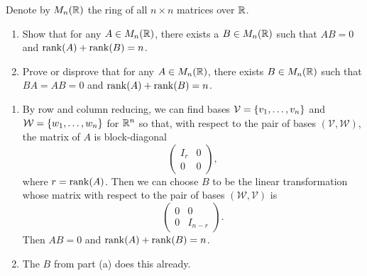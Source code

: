 \begin{question}[subtitle = August 2018 Problem 3,ID=Aug18_3]
Denote by $M_n(\mathbb{R})$ the ring of all $n \times n$ matrices over $\mathbb{R}$.
\begin{enumerate}
    \item Show that for any $A \in M_n(\mathbb{R})$, there exists a $B \in M_n(\mathbb{R})$ such that $AB = 0$ and $\operatorname{rank}(A) + \operatorname{rank}(B) = n$.
    \item Prove or disprove that for any $A \in M_n(\mathbb{R})$, there exists $B \in M_n(\mathbb{R})$ such that $BA = AB = 0$ and $\operatorname{rank}(A) + \operatorname{rank}(B) = n$.
\end{enumerate}
\end{question}
\begin{solution}
\begin{enumerate}
    \item By row and column reducing, we can find bases $\mathcal{V} = \{v_1,\dots,v_n\}$ and $\mathcal{W} = \{w_1,\dots,w_n\}$ for $\mathbb{R}^n$ so that, with respect to the pair of bases $(\mathcal{V},\mathcal{W})$, the matrix of $A$ is block-diagonal
    \[\begin{pmatrix} I_r & 0\\0 & 0 \end{pmatrix},\]
    where $r = \operatorname{rank}(A)$. Then we can choose $B$ to be the linear transformation whose matrix with respect to the pair of bases $(\mathcal{W},\mathcal{V})$ is
    \[\begin{pmatrix}0 & 0\\0 & I_{n-r} \end{pmatrix}.\]
    Then $AB = 0$ and $\operatorname{rank}(A) + \operatorname{rank}(B) = n$.
    \item The $B$ from part (a) does this already.
\end{enumerate}
\end{solution}

